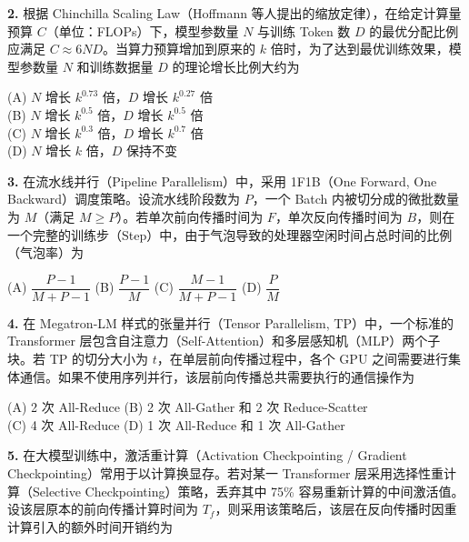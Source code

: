 \documentclass[a4paper]{ctexart}
\begin{document}
\noindent\textbf{2.} 根据 Chinchilla Scaling Law（Hoffmann 等人提出的缩放定律），在给定计算量预算 $C$（单位：FLOPs）下，模型参数量 $N$ 与训练 Token 数 $D$ 的最优分配比例应满足 $C \approx 6ND$。当算力预算增加到原来的 $k$ 倍时，为了达到最优训练效果，模型参数量 $N$ 和训练数据量 $D$ 的理论增长比例大约为

\noindent\hspace{1em}(A) $N$ 增长 $k^{0.73}$ 倍，$D$ 增长 $k^{0.27}$ 倍 \\
\noindent\hspace{1em}(B) $N$ 增长 $k^{0.5}$ 倍，$D$ 增长 $k^{0.5}$ 倍 \\
\noindent\hspace{1em}(C) $N$ 增长 $k^{0.3}$ 倍，$D$ 增长 $k^{0.7}$ 倍 \\
\noindent\hspace{1em}(D) $N$ 增长 $k$ 倍，$D$ 保持不变

\vspace{0.5em}

\noindent\textbf{3.} 在流水线并行（Pipeline Parallelism）中，采用 1F1B（One Forward, One Backward）调度策略。设流水线阶段数为 $P$，一个 Batch 内被切分成的微批数量为 $M$（满足 $M \ge P$）。若单次前向传播时间为 $F$，单次反向传播时间为 $B$，则在一个完整的训练步（Step）中，由于气泡导致的处理器空闲时间占总时间的比例（气泡率）为

\noindent\hspace{1em}(A) $\dfrac{P-1}{M+P-1}$ \quad (B) $\dfrac{P-1}{M}$ \quad (C) $\dfrac{M-1}{M+P-1}$ \quad (D) $\dfrac{P}{M}$

\vspace{0.5em}

\noindent\textbf{4.} 在 Megatron-LM 样式的张量并行（Tensor Parallelism, TP）中，一个标准的 Transformer 层包含自注意力（Self-Attention）和多层感知机（MLP）两个子块。若 TP 的切分大小为 $t$，在单层前向传播过程中，各个 GPU 之间需要进行集体通信。如果不使用序列并行，该层前向传播总共需要执行的通信操作为

\noindent\hspace{1em}(A) 2 次 All-Reduce \quad (B) 2 次 All-Gather 和 2 次 Reduce-Scatter \\
\noindent\hspace{1em}(C) 4 次 All-Reduce \quad (D) 1 次 All-Reduce 和 1 次 All-Gather

\vspace{0.5em}

\noindent\textbf{5.} 在大模型训练中，激活重计算（Activation Checkpointing / Gradient Checkpointing）常用于以计算换显存。若对某一 Transformer 层采用选择性重计算（Selective Checkpointing）策略，丢弃其中 75\% 容易重新计算的中间激活值。设该层原本的前向传播计算时间为 $T_f$，则采用该策略后，该层在反向传播时因重计算引入的额外时间开销约为
\end{document}
